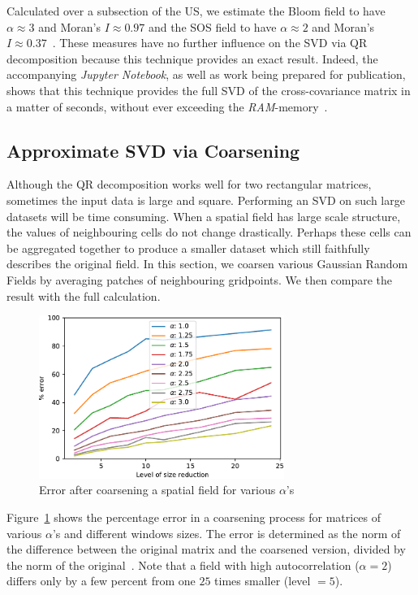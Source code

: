 \documentclass[ijgi,article,submit,moreauthors,pdftex,10pt,a4paper]{Definitions/mdpi}
\begin{document}
Calculated over a subsection of the US, we estimate the Bloom field to have $\alpha \approx 3$ and Moran's $I \approx 0.97$ and the SOS field to have $\alpha \approx 2$ and Moran's $I \approx 0.37$~\cite{Bogaardt2018}. These measures have no further influence on the SVD via QR decomposition because this technique provides an exact result. Indeed, the accompanying \textit{Jupyter Notebook}, as well as work being prepared for publication, shows that this technique provides the full SVD of the cross-covariance matrix in a matter of seconds, without ever exceeding the \textit{RAM}-memory~\cite{newRefToPhenologyArticle}.

\subsection{Approximate SVD via Coarsening}
\label{sec:Results/Approximate SVD via Coarsening}

Although the QR decomposition works well for two rectangular matrices, sometimes the input data is large and square. Performing an SVD on such large datasets will be time consuming. When a spatial field has large scale structure, the values of neighbouring cells do not change drastically. Perhaps these cells can be aggregated together to produce a smaller dataset which still faithfully describes the original field. In this section, we coarsen various Gaussian Random Fields by averaging patches of neighbouring gridpoints. We then compare the result with the full calculation.

\begin{figure}[H]
\centering
\includegraphics[width=80mm]{Results/plotSingleSpatialFieldViaCoarsening.pdf}
\caption[Error after coarsening a spatial field]{Error after coarsening a spatial field for various $\alpha$'s}
\label{fig:plotSingleSpatialFieldViaCoarsening}
\end{figure}

Figure~\ref{fig:plotSingleSpatialFieldViaCoarsening} shows the percentage error in a coarsening process for matrices of various $\alpha$'s and different windows sizes. The error is determined as the norm of the difference between the original matrix and the coarsened version, divided by the norm of the original~\cite{Bogaardt2018}. Note that a field with high autocorrelation ($\alpha=2$) differs only by a few percent from one $25$ times smaller (level $= 5$).
\end{document}
